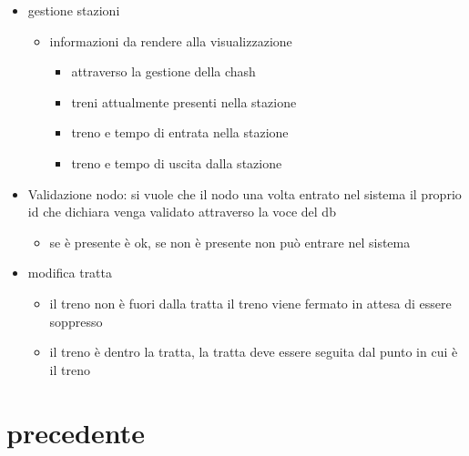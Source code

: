 \documentclass[11pt]{article}
\begin{document}
\begin{itemize}
\begin{itemize}
\begin{itemize}
\item posizione puramente a quale tratta si trova/stazione
\item ritardo (dipende da 'gestione ritardi')
\end{itemize}
\end{itemize}
\item gestione stazioni
\begin{itemize}
\item informazioni da rendere alla visualizzazione
\begin{itemize}
\item attraverso la gestione della chash
\item treni attualmente presenti nella stazione
\item treno e tempo di entrata nella stazione
\item treno e tempo di uscita dalla stazione
\end{itemize}
\end{itemize}
\item Validazione nodo: si vuole che il nodo una volta entrato nel sistema il proprio id che dichiara venga
validato attraverso la voce del db
\begin{itemize}
\item se è presente è ok, se non è presente non può entrare nel sistema
\end{itemize}
\item modifica tratta
\begin{itemize}
\item il treno non è fuori dalla tratta il treno viene fermato in attesa di essere soppresso
\item il treno è dentro la tratta, la tratta deve essere seguita dal punto in cui è il treno
\end{itemize}
\end{itemize}
\section{precedente}
\label{sec:org3a61191}
\end{document}
